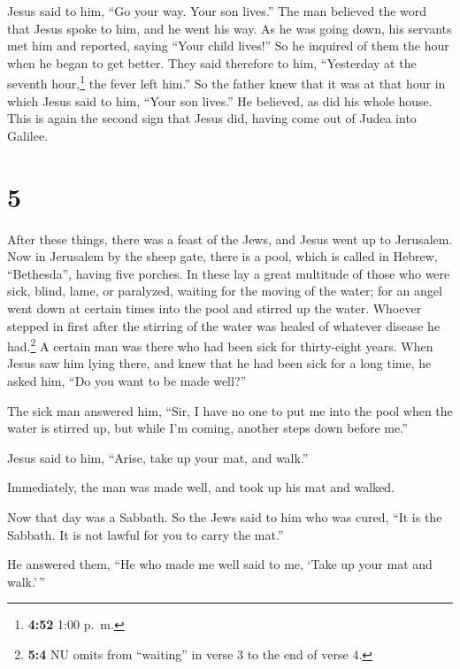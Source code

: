  Jesus said to him, ``Go your way. Your son lives.'' The
man believed the word that Jesus spoke to him, and he went his way.
 As he was going down, his servants met him and reported,
saying ``Your child lives!''  So he inquired of them the
hour when he began to get better. They said therefore to him,
``Yesterday at the seventh hour,\footnote{\textbf{4:52} 1:00 p.~m.} the
fever left him.''  So the father knew that it was at that
hour in which Jesus said to him, ``Your son lives.'' He believed, as did
his whole house.  This is again the second sign that
Jesus did, having come out of Judea into Galilee.

\hypertarget{section-4}{%
\section{5}\label{section-4}}

 After these things, there was a feast of the Jews, and
Jesus went up to Jerusalem.  Now in Jerusalem by the sheep
gate, there is a pool, which is called in Hebrew, ``Bethesda'', having
five porches.  In these lay a great multitude of those who
were sick, blind, lame, or paralyzed, waiting for the moving of the
water;  for an angel went down at certain times into the
pool and stirred up the water. Whoever stepped in first after the
stirring of the water was healed of whatever disease he had.\footnote{\textbf{5:4}
  NU omits from ``waiting'' in verse 3 to the end of verse 4.}
 A certain man was there who had been sick for
thirty-eight years.  When Jesus saw him lying there, and
knew that he had been sick for a long time, he asked him, ``Do you want
to be made well?''

 The sick man answered him, ``Sir, I have no one to put me
into the pool when the water is stirred up, but while I'm coming,
another steps down before me.''

 Jesus said to him, ``Arise, take up your mat, and walk.''

 Immediately, the man was made well, and took up his mat
and walked.

Now that day was a Sabbath.  So the Jews said to him who
was cured, ``It is the Sabbath. It is not lawful for you to carry the
mat.''

 He answered them, ``He who made me well said to me,
`Take up your mat and walk.'\,''


